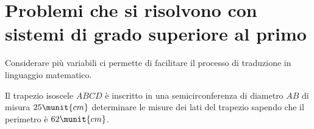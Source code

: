 % 
% 
% 
% 
% 
% 
% 
% 
\section{Problemi che si risolvono con sistemi di grado superiore al 
primo}
Considerare più variabili ci permette di facilitare il processo di 
traduzione in linguaggio matematico.

\begin{problema}{}{}
Il trapezio isoscele \({ABCD}\) è inscritto in una semicirconferenza di 
diametro \({AB}\) di misura \(25\munit{cm}\) determinare le misure dei 
lati del trapezio sapendo che il perimetro è \(62\munit{cm}\).
\end{problema}

